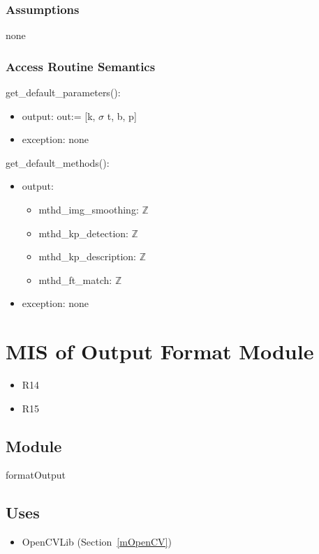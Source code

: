 \documentclass[12pt, titlepage]{article}
\begin{document}
\subsubsection{Assumptions}
none 

\subsubsection{Access Routine Semantics}
\noindent get\_default\_parameters():
\begin{itemize}
\item output: out:= [k, $\sigma$ t, b, p]
  \item exception: none  
\end{itemize}

\noindent get\_default\_methods():
\begin{itemize}
\item output:
  \begin{itemize}
    \item mthd\_img\_smoothing: $\mathbb{Z}$
    \item mthd\_kp\_detection: $\mathbb{Z}$ 
    \item mthd\_kp\_description: $\mathbb{Z}$
    \item mthd\_ft\_match: $\mathbb{Z}$
  \end{itemize}
  \item exception: none 
\end{itemize}



\section{MIS of Output Format Module} \label{mOF}
\begin{itemize}
  \item R14
  \item R15
\end{itemize}
\subsection{Module}

formatOutput

\subsection{Uses}
\begin{itemize}
  \item OpenCVLib (Section~\ref{mOpenCV})
\end{itemize}
\end{document}
